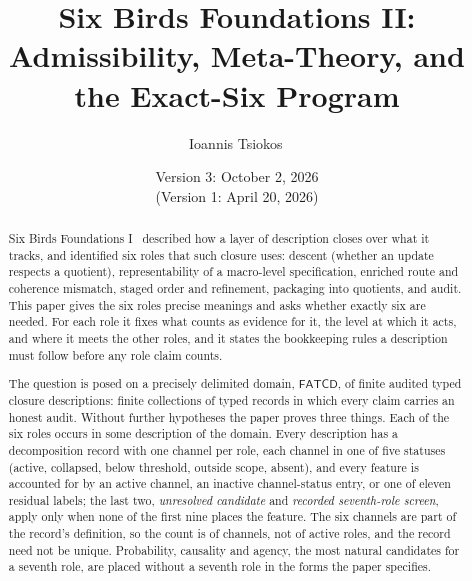 \documentclass[11pt]{article}
\theoremstyle{definition}
\newcommand{\FATCD}{\ensuremath{\mathsf{FATCD}}}
\begin{document}
\title{Six Birds Foundations II:\\[4pt]
Admissibility, Meta-Theory, and the Exact-Six Program}
\author{Ioannis Tsiokos\,}
\date{Version 3: October 2, 2026\\[2pt] \footnotesize (Version 1: April 20, 2026)}

\maketitle
\thispagestyle{firstpage}

\begin{abstract}
\noindent
Six Birds Foundations I~\citep{Tsiokos2026SixBirdsFoundations}
described how a layer of description closes over what it tracks, and
identified six roles that such closure uses: descent (whether an update
respects a quotient), representability of a macro-level specification,
enriched route and coherence mismatch, staged order and refinement, packaging into
quotients, and audit. This paper gives the six roles precise meanings
and asks whether exactly six are needed. For each role it fixes what
counts as evidence for it, the level at which it acts, and where it
meets the other roles, and it states the bookkeeping rules a
description must follow before any role claim counts.

The question is posed on a precisely delimited domain, \FATCD{}, of finite
audited typed closure descriptions: finite collections of typed records in
which every claim carries an honest audit. Without further hypotheses the paper
proves three things. Each of the six roles occurs in some description of the
domain. Every description has a decomposition record with one channel per role,
each channel in one of five statuses (active, collapsed, below threshold,
outside scope, absent), and every feature is accounted for by an active
channel, an inactive channel-status entry, or one of eleven residual labels;
the last two, \emph{unresolved candidate} and \emph{recorded seventh-role
screen}, apply only when none of the first nine places the feature. The six channels are part of the record's definition, so the
count is of channels, not of active roles, and the record need not be unique.
Probability, causality and agency, the most natural candidates for a seventh
role, are placed without a seventh role in the forms the paper specifies.


\end{abstract}
\end{document}
